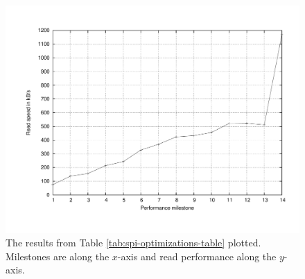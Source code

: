 \begin{figure}[H]
  \centering
  \includegraphics[width=\textwidth]{fig/avr/spi-optimizations-plot.pdf}
  \caption[SPI Optimizations Plot]{The results from Table
    \ref{tab:spi-optimizations-table} plotted. Milestones are along the
    $x$-axis and read performance along the $y$-axis.}
  \label{fig:spi-optimizations-plot}
\end{figure}
